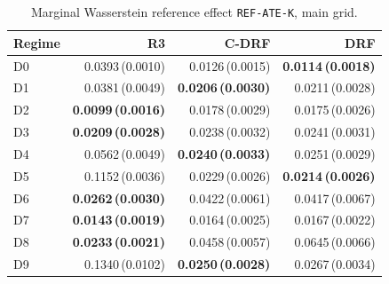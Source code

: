 \begin{table}[htbp]
\centering
\caption{Marginal Wasserstein reference effect \texttt{REF-ATE-K}, main grid.}
\label{tab:all-refate}
\scriptsize
\setlength{\tabcolsep}{3.2pt}
\begin{tabular}{@{}lrrr@{}}
\toprule
Regime & R3 & C-DRF & DRF \\
\midrule
D0 & 0.0393\,(0.0010) & 0.0126\,(0.0015) & \textbf{0.0114\,(0.0018)} \\
D1 & 0.0381\,(0.0049) & \textbf{0.0206\,(0.0030)} & 0.0211\,(0.0028) \\
D2 & \textbf{0.0099\,(0.0016)} & 0.0178\,(0.0029) & 0.0175\,(0.0026) \\
D3 & \textbf{0.0209\,(0.0028)} & 0.0238\,(0.0032) & 0.0241\,(0.0031) \\
D4 & 0.0562\,(0.0049) & \textbf{0.0240\,(0.0033)} & 0.0251\,(0.0029) \\
D5 & 0.1152\,(0.0036) & 0.0229\,(0.0026) & \textbf{0.0214\,(0.0026)} \\
D6 & \textbf{0.0262\,(0.0030)} & 0.0422\,(0.0061) & 0.0417\,(0.0067) \\
D7 & \textbf{0.0143\,(0.0019)} & 0.0164\,(0.0025) & 0.0167\,(0.0022) \\
D8 & \textbf{0.0233\,(0.0021)} & 0.0458\,(0.0057) & 0.0645\,(0.0066) \\
D9 & 0.1340\,(0.0102) & \textbf{0.0250\,(0.0028)} & 0.0267\,(0.0034) \\
\bottomrule
\end{tabular}
\end{table}

